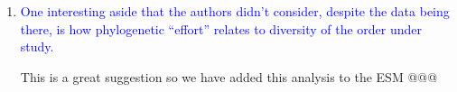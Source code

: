\documentclass[12pt,letterpaper]{article}
\begin{document}
\begin{enumerate}


\item{\textcolor{blue}{One interesting aside that the authors didn't consider, despite the data being there, is how phylogenetic ``effort'' relates to diversity of the order under study.}}

This is a great suggestion so we have added this analysis to the ESM @@@%

\end{enumerate}
\end{document}
